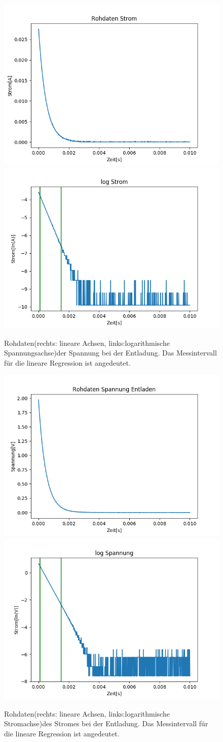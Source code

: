 \documentclass[12pt,a4paper]{article}
\begin{document}
\begin{figure}[H]
\begin{center}
\includegraphics[width=0.49\linewidth]{Bilder/Kondensator_I}
\includegraphics[width=0.49\linewidth]{Bilder/Kondensator_logI}
\caption[Rohdaten logarith. A]{Rohdaten(rechts: lineare Achsen, links:logarithmische Spannungsachse)der Spannung bei der Entladung. Das Messintervall für die lineare Regression ist angedeutet.}
\label{fig:RohU}
\end{center}
\end{figure}

\begin{figure}[H]
\begin{center}
\includegraphics[width=0.49\linewidth]{Bilder/Kondensator_ent_U}
\includegraphics[width=0.49\linewidth]{Bilder/Kondensator_ent_logU}
\caption[Rohdaten logarith. A]{Rohdaten(rechts: lineare Achsen, links:logarithmische Stromachse)des Stromes bei der Entladung. Das Messintervall für die lineare Regression ist angedeutet.}
\label{fig:RohU}
\end{center}
\end{figure}
\end{document}
